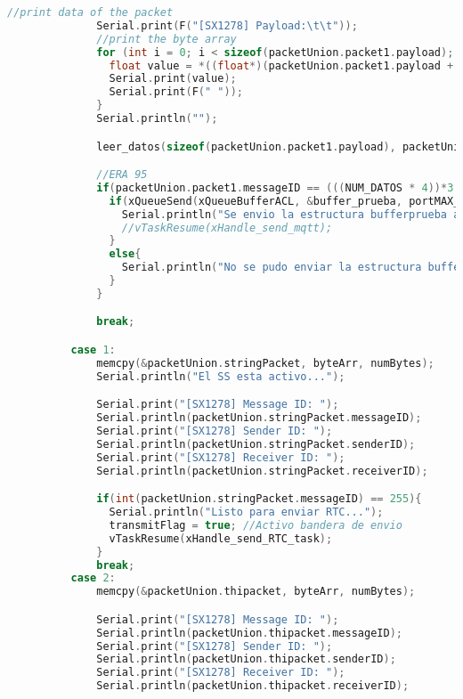 \begin{lstlisting}[language=C++, caption=Tarea de recepción de datos de aceleración vía Lora en estación base]
              //print data of the packet
              Serial.print(F("[SX1278] Payload:\t\t"));
              //print the byte array
              for (int i = 0; i < sizeof(packetUnion.packet1.payload); i+=4) {
                float value = *((float*)(packetUnion.packet1.payload + i));
                Serial.print(value);
                Serial.print(F(" "));
              }
              Serial.println("");

              leer_datos(sizeof(packetUnion.packet1.payload), packetUnion.packet1.messageID, packetUnion.packet1.senderID, packetUnion.packet1.receiverID, packetUnion.packet1.payload);

              //ERA 95
              if(packetUnion.packet1.messageID == (((NUM_DATOS * 4))*3 / 128) - 1){
                if(xQueueSend(xQueueBufferACL, &buffer_prueba, portMAX_DELAY)){
                  Serial.println("Se envio la estructura bufferprueba a la cola xQueueBufferACL");
                  //vTaskResume(xHandle_send_mqtt);
                }
                else{
                  Serial.println("No se pudo enviar la estructura bufferprueba a la cola xQueueBufferACL");
                }
              }

              break;

          case 1:
              memcpy(&packetUnion.stringPacket, byteArr, numBytes);
              Serial.println("El SS esta activo...");

              Serial.print("[SX1278] Message ID: ");
              Serial.println(packetUnion.stringPacket.messageID);
              Serial.print("[SX1278] Sender ID: ");
              Serial.println(packetUnion.stringPacket.senderID);
              Serial.print("[SX1278] Receiver ID: ");
              Serial.println(packetUnion.stringPacket.receiverID);

              if(int(packetUnion.stringPacket.messageID) == 255){
                Serial.println("Listo para enviar RTC...");
                transmitFlag = true; //Activo bandera de envio
                vTaskResume(xHandle_send_RTC_task);
              }
              break;
          case 2:
              memcpy(&packetUnion.thipacket, byteArr, numBytes);

              Serial.print("[SX1278] Message ID: ");
              Serial.println(packetUnion.thipacket.messageID);
              Serial.print("[SX1278] Sender ID: ");
              Serial.println(packetUnion.thipacket.senderID);
              Serial.print("[SX1278] Receiver ID: ");
              Serial.println(packetUnion.thipacket.receiverID);


\end{lstlisting}
